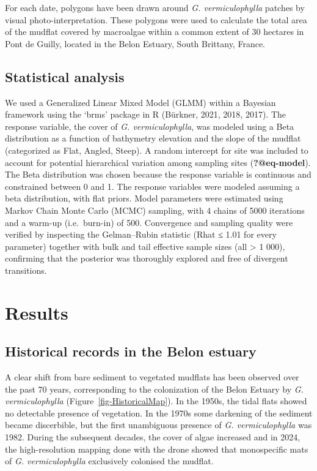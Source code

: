 \documentclass[
  letterpaper,
  DIV=11,
  numbers=noendperiod]{scrartcl}
\begin{document}
For each date, polygons have been drawn around \emph{G. vermiculophylla}
patches by visual photo-interpretation. These polygons were used to
calculate the total area of the mudflat covered by macroalgae within a
common extent of 30 hectares in Pont de Guilly, located in the Belon
Estuary, South Brittany, France.

\subsection{Statistical analysis}\label{statistical-analysis}

We used a Generalized Linear Mixed Model (GLMM) within a Bayesian
framework using the `brms' package in R (Bürkner, 2021, 2018, 2017). The
response variable, the cover of \emph{G. vermiculophylla}, was modeled
using a Beta distribution as a function of bathymetry elevation and the
slope of the mudflat (categorized as Flat, Angled, Steep). A random
intercept for site was included to account for potential hierarchical
variation among sampling sites (\textbf{?@eq-model}). The Beta
distribution was chosen because the response variable is continuous and
constrained between 0 and 1. The response variables were modeled
assuming a beta distribution, with flat priors. Model parameters were
estimated using Markov Chain Monte Carlo (MCMC) sampling, with 4 chains
of 5000 iterations and a warm-up (i.e.~burn-in) of 500. Convergence and
sampling quality were verified by inspecting the Gelman--Rubin statistic
(Rhat ≤ 1.01 for every parameter) together with bulk and tail effective
sample sizes (all \textgreater{} 1 000), confirming that the posterior
was thoroughly explored and free of divergent transitions.

\section{Results}\label{results}

\subsection{Historical records in the Belon
estuary}\label{historical-records-in-the-belon-estuary}

A clear shift from bare sediment to vegetated mudflats has been observed
over the past 70 years, corresponding to the colonization of the Belon
Estuary by \emph{G. vermiculophylla} (Figure~\ref{fig-HistoricalMap}).
In the 1950s, the tidal flats showed no detectable presence of
vegetation. In the 1970s some darkening of the sediment became
discerbible, but the first unambiguous presence of \emph{G.
vermiculophylla} was 1982. During the subsequent decades, the cover of
algae increased and in 2024, the high-resolution mapping done with the
drone showed that monospecific mats of \emph{G. vermiculophylla}
exclusively colonised the mudflat.
\end{document}

